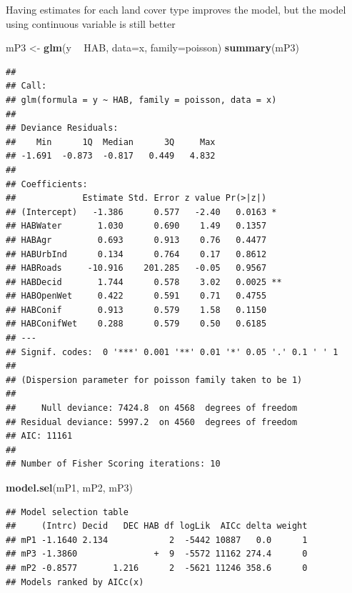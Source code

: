 \documentclass[12pt,]{book}
\newenvironment{Shaded}{\begin{snugshade}}{\end{snugshade}}
\newcommand{\DataTypeTok}[1]{\textcolor[rgb]{0.13,0.29,0.53}{#1}}
\newcommand{\KeywordTok}[1]{\textcolor[rgb]{0.13,0.29,0.53}{\textbf{#1}}}
\newcommand{\NormalTok}[1]{#1}
\newcommand{\OperatorTok}[1]{\textcolor[rgb]{0.81,0.36,0.00}{\textbf{#1}}}
\newcommand{\StringTok}[1]{\textcolor[rgb]{0.31,0.60,0.02}{#1}}
\begin{document}
Having estimates for each land cover type improves the model,
but the model using continuous variable is still better

\begin{Shaded}
\begin{Highlighting}[]
\NormalTok{mP3 <-}\StringTok{ }\KeywordTok{glm}\NormalTok{(y }\OperatorTok{~}\StringTok{ }\NormalTok{HAB, }\DataTypeTok{data=}\NormalTok{x, }\DataTypeTok{family=}\NormalTok{poisson)}
\KeywordTok{summary}\NormalTok{(mP3)}
\end{Highlighting}
\end{Shaded}

\begin{verbatim}
## 
## Call:
## glm(formula = y ~ HAB, family = poisson, data = x)
## 
## Deviance Residuals: 
##    Min      1Q  Median      3Q     Max  
## -1.691  -0.873  -0.817   0.449   4.832  
## 
## Coefficients:
##             Estimate Std. Error z value Pr(>|z|)   
## (Intercept)   -1.386      0.577   -2.40   0.0163 * 
## HABWater       1.030      0.690    1.49   0.1357   
## HABAgr         0.693      0.913    0.76   0.4477   
## HABUrbInd      0.134      0.764    0.17   0.8612   
## HABRoads     -10.916    201.285   -0.05   0.9567   
## HABDecid       1.744      0.578    3.02   0.0025 **
## HABOpenWet     0.422      0.591    0.71   0.4755   
## HABConif       0.913      0.579    1.58   0.1150   
## HABConifWet    0.288      0.579    0.50   0.6185   
## ---
## Signif. codes:  0 '***' 0.001 '**' 0.01 '*' 0.05 '.' 0.1 ' ' 1
## 
## (Dispersion parameter for poisson family taken to be 1)
## 
##     Null deviance: 7424.8  on 4568  degrees of freedom
## Residual deviance: 5997.2  on 4560  degrees of freedom
## AIC: 11161
## 
## Number of Fisher Scoring iterations: 10
\end{verbatim}

\begin{Shaded}
\begin{Highlighting}[]
\KeywordTok{model.sel}\NormalTok{(mP1, mP2, mP3)}
\end{Highlighting}
\end{Shaded}

\begin{verbatim}
## Model selection table 
##     (Intrc) Decid   DEC HAB df logLik  AICc delta weight
## mP1 -1.1640 2.134            2  -5442 10887   0.0      1
## mP3 -1.3860               +  9  -5572 11162 274.4      0
## mP2 -0.8577       1.216      2  -5621 11246 358.6      0
## Models ranked by AICc(x)
\end{verbatim}
\end{document}
